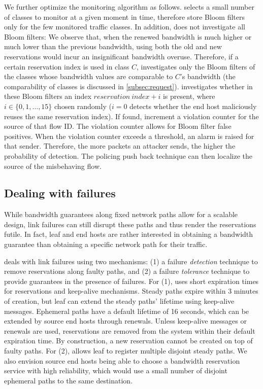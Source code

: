 We further optimize the monitoring algorithm as follows. \name selects a small
number of classes to monitor at a given moment in time, therefore \ADs store
Bloom filters only for the few monitored traffic classes. In addition, \name
does not investigate all Bloom filters: We observe that, when the renewed
bandwidth is much higher or much lower than the previous bandwidth, using both
the old and new reservations would incur an insignificant bandwidth overuse.
Therefore, if a certain reservation index is used in class $C$, \name
investigates only the Bloom filters of the classes whose bandwidth values are
comparable to $C$'s bandwidth (the comparability of classes is discussed in
\autoref{subsec:request}).  \name investigates whether in these Bloom filters
an index $\mathit{reservation\ index} + i$ is present, where $i \in \{0, 1, \ldots,
15\}$ chosen randomly ($i=0$ detects whether the end host maliciously reuses
the same reservation index).  If found, \ADs increment a violation counter for
the source of that flow ID.  The violation counter allows for Bloom filter
false positives. When the violation counter exceeds a threshold, an alarm is
raised for that sender.  Therefore, the more packets an attacker sends, the
higher the probability of detection.  The policing push back technique can then
localize the source \AD of the misbehaving flow. 

\subsection{Dealing with failures}

\noindent
While bandwidth guarantees along fixed network paths allow for a
scalable design, link failures can still disrupt these paths and thus render
the reservations futile. In fact, leaf \ADs and end hosts are rather
interested in obtaining a bandwidth guarantee than
obtaining a specific network path for their traffic.

\name deals with link failures using two mechanisms: (1)
a failure \emph{detection} technique to remove reservations along
faulty paths, and (2) a failure \emph{tolerance} technique to provide
guarantees in the presence of failures. For (1), \name uses short
expiration times for reservations and keep-alive mechanisms. Steady
paths expire within 3 minutes of creation, but leaf \ADs can extend
the steady paths' lifetime using keep-alive messages. Ephemeral paths
have a default lifetime of 16 seconds, which can be extended by
source end hosts through renewals. Unless keep-alive messages or
renewals are used, reservations are removed from the system within
their default expiration time. By construction, a new reservation
cannot be created on top of faulty paths. For (2), \name allows
leaf \ADs to register multiple disjoint steady paths. We also
envision source end hosts being able to choose a bandwidth
reservation service with high reliability, which would use a
small number of disjoint ephemeral paths to the same destination.


